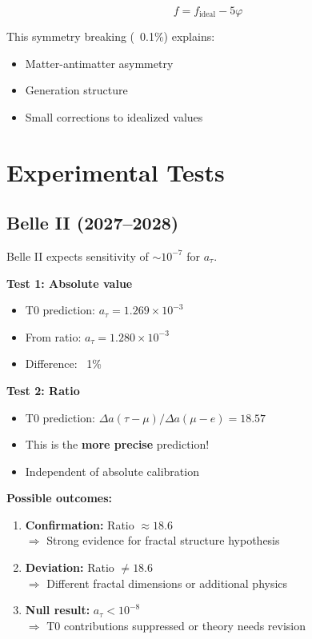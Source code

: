 	\begin{equation}
		f = f_{\text{ideal}} - 5\varphi
	\end{equation}
	
	This symmetry breaking (~0.1\%) explains:
	\begin{itemize}
		\item Matter-antimatter asymmetry
		\item Generation structure
		\item Small corrections to idealized values
	\end{itemize}
	
	\section{Experimental Tests}
	
	\subsection{Belle II (2027--2028)}
	
	Belle II expects sensitivity of $\sim 10^{-7}$ for $a_\tau$.
	
	\textbf{Test 1: Absolute value}
	\begin{itemize}
		\item T0 prediction: $a_\tau = 1.269 \times 10^{-3}$
		\item From ratio: $a_\tau = 1.280 \times 10^{-3}$
		\item Difference: ~1\%
	\end{itemize}
	
	\textbf{Test 2: Ratio}
	\begin{itemize}
		\item T0 prediction: $\Delta a(\tau - \mu) / \Delta a(\mu - e) = 18.57$
		\item This is the \textbf{more precise} prediction!
		\item Independent of absolute calibration
	\end{itemize}
	
	\textbf{Possible outcomes:}
	\begin{enumerate}
		\item \textbf{Confirmation:} Ratio $\approx 18.6$ \\
		$\Rightarrow$ Strong evidence for fractal structure hypothesis
		
		\item \textbf{Deviation:} Ratio $\neq 18.6$ \\
		$\Rightarrow$ Different fractal dimensions or additional physics
		
		\item \textbf{Null result:} $a_\tau < 10^{-8}$ \\
		$\Rightarrow$ T0 contributions suppressed or theory needs revision
	\end{enumerate}
	
